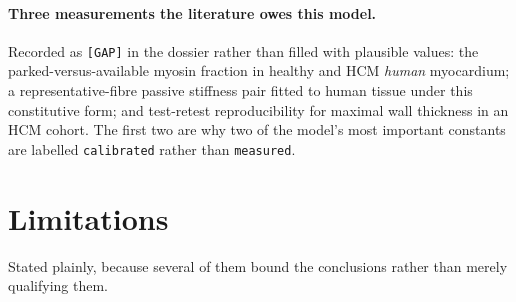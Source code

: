 \documentclass[11pt,a4paper]{article}
\begin{document}
\paragraph{Three measurements the literature owes this model.} Recorded as \texttt{[GAP]} in
the dossier rather than filled with plausible values: the parked-versus-available myosin
fraction in healthy and HCM \emph{human} myocardium; a representative-fibre passive stiffness
pair fitted to human tissue under this constitutive form; and test-retest reproducibility for
maximal wall thickness in an HCM cohort. The first two are why two of the model's most
important constants are labelled \texttt{calibrated} rather than \texttt{measured}.

\section{Limitations}

Stated plainly, because several of them bound the conclusions rather than merely qualifying
them.
\end{document}
